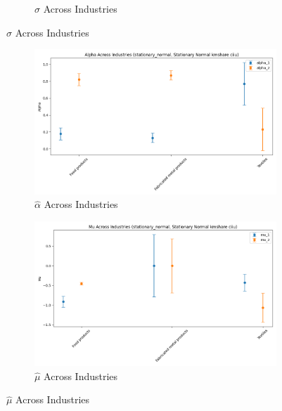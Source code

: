 \documentclass{article}
\begin{document}
\begin{figure}[ht!]
\begin{subfigure}[t]{0.32\textwidth}
        \caption{$\hat\sigma$ Across Industries}
    \end{subfigure}
\end{figure}

\begin{figure}[ht!]
    \centering 
    \caption{I.I.D Normal Model Across Industries}
    \begin{subfigure}[t]{0.32\textwidth}
        \centering
        \includegraphics[width=\textwidth]{figure/stationary_normal_kmshare_ciiu_alpha_across_industries.png}
        \caption{$\hat\alpha$ Across Industries}
    \end{subfigure}
    \begin{subfigure}[t]{0.32\textwidth}
        \centering
        \includegraphics[width=\textwidth]{figure/stationary_normal_kmshare_ciiu_mu_across_industries.png}
        \caption{$\hat\mu$ Across Industries}
    \end{subfigure}
 

\end{figure}
\end{document}
